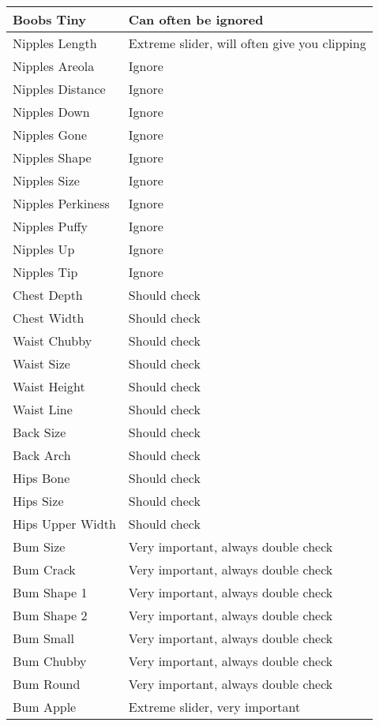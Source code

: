 \begin{longtable}{| p{} | p{} |}
    Boobs Tiny & Can often be ignored \\ \hline
    Nipples Length & Extreme slider, will often give you clipping \\ \hline
    Nipples Areola & Ignore \\ \hline
    Nipples Distance & Ignore \\ \hline
    Nipples Down & Ignore \\ \hline
    Nipples Gone & Ignore \\ \hline
    Nipples Shape & Ignore \\ \hline
    Nipples Size & Ignore \\ \hline
    Nipples Perkiness & Ignore \\ \hline
    Nipples Puffy & Ignore \\ \hline
    Nipples Up & Ignore \\ \hline
    Nipples Tip & Ignore \\ \hline
    Chest Depth & Should check \\ \hline
    Chest Width & Should check \\ \hline
    Waist Chubby & Should check \\ \hline
    Waist Size & Should check \\ \hline
    Waist Height & Should check \\ \hline
    Waist Line & Should check \\ \hline
    Back Size & Should check \\ \hline
    Back Arch & Should check \\ \hline
    Hips Bone & Should check \\ \hline
    Hips Size & Should check \\ \hline
    Hips Upper Width & Should check \\ \hline
    Bum Size & Very important, always double check \\ \hline
    Bum Crack & Very important, always double check \\ \hline
    Bum Shape 1 & Very important, always double check \\ \hline
    Bum Shape 2 & Very important, always double check \\ \hline
    Bum Small & Very important, always double check \\ \hline
    Bum Chubby & Very important, always double check \\ \hline
    Bum Round & Very important, always double check \\ \hline
    Bum Apple & Extreme slider, very important \\ \hline

\end{longtable}
